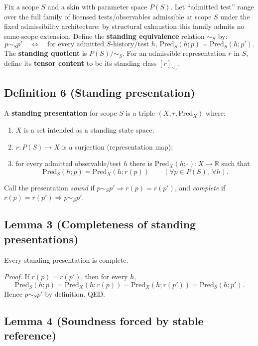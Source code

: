 \documentclass[12pt]{article}
\theoremstyle{plain}
\begin{document}
Fix a scope $S$ and a skin with parameter space $P(S)$. Let ``admitted test'' range over the full family of licensed tests/observables admissible at scope $S$ under the fixed admissibility architecture; by structural exhaustion this family admits no same-scope extension. Define the \textbf{standing equivalence} relation $\sim_S$ by:
\[
 p \sim_S p' \quad \Longleftrightarrow \quad \text{for every admitted $S$-history/test $h$, } \mathrm{Pred}_S(h;p)=\mathrm{Pred}_S(h;p').
\]
The \textbf{standing quotient} is $P(S)/\sim_S$. For an admissible representation $r$ in $S$, define its \textbf{tensor content} to be its standing class $[r]_{\sim_S}$.

\subsection{Definition 6 (Standing presentation)}

A \textbf{standing presentation} for scope $S$ is a triple $(X,r,\mathrm{Pred}_X)$ where:

\begin{enumerate}[leftmargin=*]
\item $X$ is a set intended as a standing state space;
\item $r:P(S)\to X$ is a surjection (representation map);
\item for every admitted observable/test $h$ there is $\mathrm{Pred}_X(h;\cdot):X\to \mathbb{R}$ such that
\[
\mathrm{Pred}_S(h;p)=\mathrm{Pred}_X(h;r(p))\qquad(\forall p\in P(S),\ \forall h).
\]
\end{enumerate}

Call the presentation \emph{sound} if $p\sim_S p'\Rightarrow r(p)=r(p')$, and \emph{complete} if $r(p)=r(p')\Rightarrow p\sim_S p'$.

\subsection{Lemma 3 (Completeness of standing presentations)}

Every standing presentation is complete.

\textit{Proof.} If $r(p)=r(p')$, then for every $h$,
\[
\mathrm{Pred}_S(h;p)=\mathrm{Pred}_X(h;r(p))=\mathrm{Pred}_X(h;r(p'))=\mathrm{Pred}_S(h;p').
\]
Hence $p\sim_S p'$ by definition. QED.

\subsection{Lemma 4 (Soundness forced by stable reference)}
\end{document}
